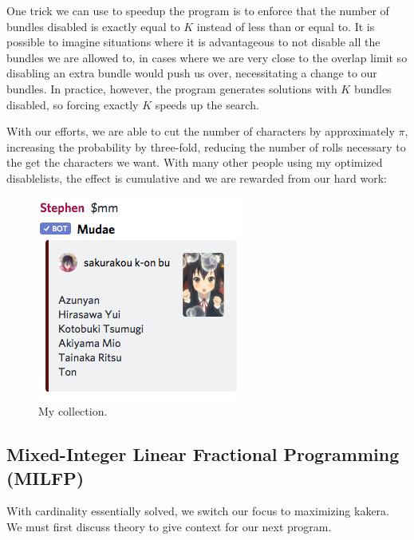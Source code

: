 \documentclass[11pt, oneside]{article}
\theoremstyle{plain}
\theoremstyle{definition}
\begin{document}
One trick we can use to speedup the program is to enforce that the number of
bundles disabled is exactly equal to \( K \) instead of less than or equal to.
It is possible to imagine situations where it is advantageous to not disable
all the bundles we are allowed to, in cases where we are very close to the
overlap limit so disabling an extra bundle would push us over, necessitating a
change to our bundles. In practice, however, the program generates solutions
with \( K \) bundles disabled, so forcing exactly \( K \) speeds up the search.

With our efforts, we are able to cut the number of characters by
approximately \( \pi \), increasing the probability by three-fold,
reducing the number of rolls necessary to the get the characters
we want. With many other people using my optimized disablelists,
the effect is cumulative and we are rewarded from our hard work:
\begin{figure}[h!]
  \centering
  \includegraphics[scale=1]{images/collection.png}
  \caption{My collection.}
\end{figure}

\subsection{Mixed-Integer Linear Fractional Programming (MILFP)}
With cardinality essentially solved, we switch our focus to maximizing
kakera. We must first discuss theory to give context for our next program.
\end{document}
